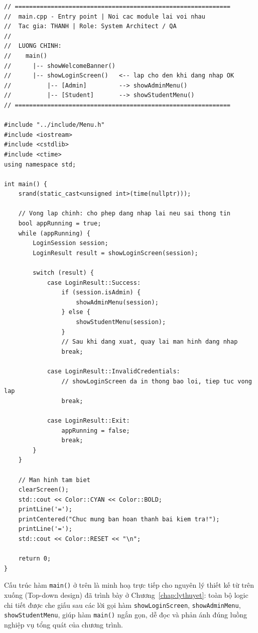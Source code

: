 \documentclass[11pt]{report}
\begin{document}
\begin{lstlisting}[caption={Toàn bộ mã nguồn main.cpp}, label={lst:appendix_main}]
// ============================================================
//  main.cpp - Entry point | Noi cac module lai voi nhau
//  Tac gia: THANH | Role: System Architect / QA
//
//  LUONG CHINH:
//    main()
//      |-- showWelcomeBanner()
//      |-- showLoginScreen()   <-- lap cho den khi dang nhap OK
//          |-- [Admin]         --> showAdminMenu()
//          |-- [Student]       --> showStudentMenu()
// ============================================================

#include "../include/Menu.h"
#include <iostream>
#include <cstdlib>
#include <ctime>
using namespace std;

int main() {
    srand(static_cast<unsigned int>(time(nullptr)));

    // Vong lap chinh: cho phep dang nhap lai neu sai thong tin
    bool appRunning = true;
    while (appRunning) {
        LoginSession session;
        LoginResult result = showLoginScreen(session);

        switch (result) {
            case LoginResult::Success:
                if (session.isAdmin) {
                    showAdminMenu(session);
                } else {
                    showStudentMenu(session);
                }
                // Sau khi dang xuat, quay lai man hinh dang nhap
                break;

            case LoginResult::InvalidCredentials:
                // showLoginScreen da in thong bao loi, tiep tuc vong lap
                break;

            case LoginResult::Exit:
                appRunning = false;
                break;
        }
    }

    // Man hinh tam biet
    clearScreen();
    std::cout << Color::CYAN << Color::BOLD;
    printLine('=');
    printCentered("Chuc mung ban hoan thanh bai kiem tra!");
    printLine('=');
    std::cout << Color::RESET << "\n";

    return 0;
}
\end{lstlisting}

Cấu trúc hàm \texttt{main()} ở trên là minh hoạ trực tiếp cho nguyên lý thiết kế từ trên xuống (Top-down design) đã trình bày ở Chương~\ref{chap:lythuyet}: toàn bộ logic chi tiết được che giấu sau các lời gọi hàm \texttt{showLoginScreen}, \texttt{showAdminMenu}, \texttt{showStudentMenu}, giúp hàm \texttt{main()} ngắn gọn, dễ đọc và phản ánh đúng luồng nghiệp vụ tổng quát của chương trình.
\end{document}
